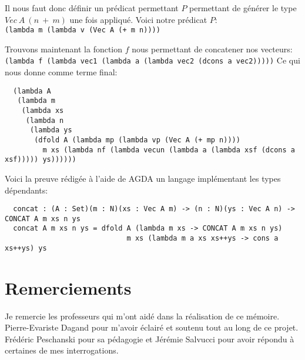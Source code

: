 \documentclass {article}
\theoremstyle{definition}
\theoremstyle{remark}
\newcommand{\fun}[1]{\lstinline!#1!}
\begin{document}
Il nous faut donc définir un prédicat permettant $P$ permettant de générer le type $Vec\:A\:(n\: +\: m)$
une fois appliqué.
Voici notre prédicat $P$: \\
\fun{(lambda m (lambda v (Vec A (+ m n))))}

Trouvons maintenant la fonction $f$ nous permettant de concatener nos vecteurs: \\
\fun{(lambda f (lambda vec1 (lambda a (lambda vec2 (dcons a vec2)))))}
Ce qui nous donne comme terme final:

\begin{lstlisting} 
  (lambda A
   (lambda m
    (lambda xs
     (lambda n
      (lambda ys
       (dfold A (lambda mp (lambda vp (Vec A (+ mp n))))
         m xs (lambda nf (lambda vecun (lambda a (lambda xsf (dcons a xsf))))) ys))))))  
\end{lstlisting}

Voici la preuve rédigée à l'aide de AGDA un langage implémentant les types dépendants:
\begin{lstlisting}
  concat : (A : Set)(m : N)(xs : Vec A m) -> (n : N)(ys : Vec A n) -> CONCAT A m xs n ys
  concat A m xs n ys = dfold A (lambda m xs -> CONCAT A m xs n ys)
                             m xs (lambda m a xs xs++ys -> cons a xs++ys) ys 
\end{lstlisting}



\section*{Remerciements}

Je remercie les professeurs qui m'ont aidé dans la réalisation de ce mémoire.
Pierre-Evariste Dagand pour m'avoir éclairé et soutenu tout au long de ce projet.
Frédéric Peschanski pour sa pédagogie et 
Jérémie Salvucci pour avoir répondu à certaines de mes interrogations.




















\end{document}
